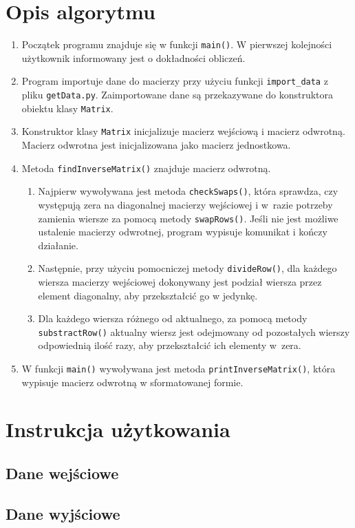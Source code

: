 \documentclass[12pt]{article}
\begin{document}
\section{Opis algorytmu}
\begin{enumerate}
\item Początek programu znajduje się w funkcji \verb|main()|. W pierwszej kolejności użytkownik informowany jest o dokładności obliczeń.
\item Program importuje dane do macierzy przy użyciu funkcji \verb|import_data| z pliku \verb|getData.py|. Zaimportowane dane są przekazywane do konstruktora obiektu klasy \verb|Matrix|.
\item Konstruktor klasy \verb|Matrix| inicjalizuje macierz wejściową i macierz odwrotną. Macierz odwrotna jest inicjalizowana jako macierz jednostkowa.
\item Metoda \verb|findInverseMatrix()| znajduje macierz odwrotną. 
\begin{enumerate}
    \item Najpierw wywoływana jest metoda \verb|checkSwaps()|, która sprawdza, czy występują zera na diagonalnej macierzy wejściowej i w~razie potrzeby zamienia wiersze za pomocą metody \verb|swapRows()|. Jeśli nie jest możliwe ustalenie macierzy odwrotnej, program wypisuje komunikat i kończy działanie.
    \item Następnie, przy użyciu pomocniczej metody \verb|divideRow()|, dla każdego wiersza macierzy wejściowej dokonywany jest podział wiersza przez element diagonalny, aby przekształcić go w jedynkę.
    \item Dla każdego wiersza różnego od aktualnego, za pomocą metody \verb|substractRow()| aktualny wiersz jest odejmowany od pozostałych wierszy odpowiednią ilość razy, aby przekształcić ich elementy  w~zera.
\end{enumerate}
\item W funkcji \verb|main()| wywoływana jest metoda \verb|printInverseMatrix()|, która wypisuje macierz odwrotną w sformatowanej formie.
\end{enumerate}

\section{Instrukcja użytkowania}
\subsection{Dane wejściowe}
\subsection{Dane wyjściowe}
\end{document}
